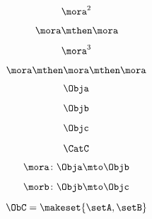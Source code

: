 {\begin{forslides}
        \begin{equation}
            \label{eq:semicats-slides-67}
            \mora^2
        \end{equation}

        \begin{equation}
            \label{eq:semicats-slides-68}
            \mora \mthen \mora
        \end{equation}

        \begin{equation}
            \label{eq:semicats-slides-69}
            \mora^3
        \end{equation}

        \begin{equation}
            \label{eq:semicats-slides-70}
            \mora \mthen \mora \mthen \mora
        \end{equation}

        \begin{equation}
            \label{eq:semicats-slides-71}
            \Obja
        \end{equation}

        \begin{equation}
            \label{eq:semicats-slides-72}
            \Objb
        \end{equation}

        \begin{equation}
            \label{eq:semicats-slides-73}
            \Objc
        \end{equation}

        \begin{equation}
            \label{eq:semicats-slides-74}
            \CatC
        \end{equation}

        \begin{equation}
            \label{eq:semicats-slides-75}
            \mora\colon \Obja \mto \Objb
        \end{equation}

        \begin{equation}
            \label{eq:semicats-slides-76}
            \morb\colon \Objb \mto \Objc
        \end{equation}

        \begin{equation}
            \label{eq:semicats-slides-77}
            \ObC = \makeset{ \setA, \setB }
        \end{equation}


\end{forslides}}
